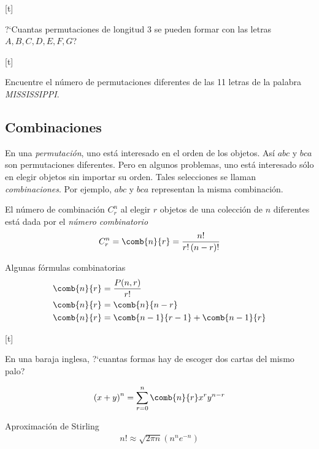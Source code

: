 [t]{}
\begin{exmp}
	\label{exmp:1.16}
	?`Cuantas permutaciones de longitud 3 se pueden formar con las letras $A,B,C,D,E,F,G$?
\end{exmp}


[t]{}
\begin{exmp}
	\label{exmp:1.17}
	Encuentre el número de permutaciones diferentes de las 11 letras de la palabra \emph{MISSISSIPPI}.
\end{exmp}


\subsection{Combinaciones}
{}
En una \emph{permutación}, uno está interesado en el orden de los objetos. Así $abc$ y $bca$ son permutaciones diferentes.  Pero en algunos problemas, uno está interesado sólo en elegir objetos sin importar su orden.  Tales selecciones se llaman \emph{combinaciones}.  Por ejemplo, $abc$ y $bca$ representan la misma combinación.



El número de combinación $ C^{n}_{r} $ al elegir $r$ objetos de una colección de $n$ diferentes está dada por el \emph{número combinatorio}
\begin{align}
	\label{1.29}
	C^{n}_{r} = \comb{n}{r}=\dfrac{n!}{r!\left( n-r \right)!}
\end{align}



{Algunas fórmulas combinatorias}
\begin{align}
	\label{1.30}
	\comb{n}{r}&=\dfrac{P(n,r)}{r!} \\
	\label{1.31}
	\comb{n}{r}&=\comb{n}{n-r}\\
	\comb{n}{r}&=\comb{n-1}{r-1}+\comb{n-1}{r}
\end{align}


[t]{}
\begin{exmp}
	\label{exmp:1.18}
	En una baraja inglesa, ?`cuantas formas hay de escoger dos cartas del mismo palo?
\end{exmp}


{}
\begin{thm}
	\begin{align}
		\label{1.32}
		\left( x+y \right)^{n} = \sum_{r=0}^{n}\comb{n}{r}x^{r}y^{n-r}
	\end{align}
	
\end{thm}


{Aproximación de Stirling}
\begin{align}
	\label{1.33}
	n! \approx \sqrt{2\pi n}\left( n^{n}e^{-n} \right)
\end{align}


